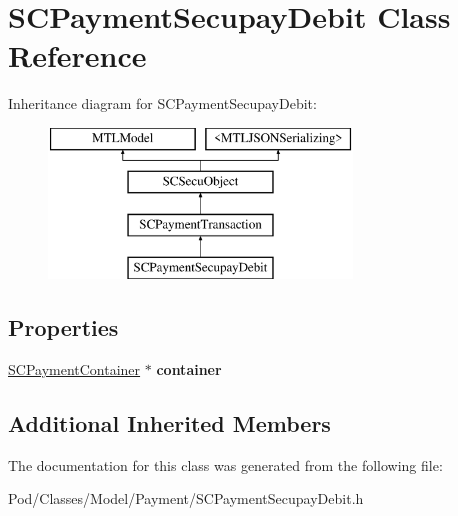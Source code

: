\hypertarget{interface_s_c_payment_secupay_debit}{}\section{S\+C\+Payment\+Secupay\+Debit Class Reference}
\label{interface_s_c_payment_secupay_debit}
Inheritance diagram for S\+C\+Payment\+Secupay\+Debit\+:\begin{figure}[H]
\begin{center}
\leavevmode
\includegraphics[height=4.000000cm]{interface_s_c_payment_secupay_debit}
\end{center}
\end{figure}
\subsection*{Properties}
\begin{DoxyCompactItemize}
\item 
\hyperlink{interface_s_c_payment_container}{S\+C\+Payment\+Container} $\ast$ {\bfseries container}\hypertarget{interface_s_c_payment_secupay_debit_a251737450654d47150e4afee17e11108}{}\label{interface_s_c_payment_secupay_debit_a251737450654d47150e4afee17e11108}

\end{DoxyCompactItemize}
\subsection*{Additional Inherited Members}


The documentation for this class was generated from the following file\+:\begin{DoxyCompactItemize}
\item 
Pod/\+Classes/\+Model/\+Payment/S\+C\+Payment\+Secupay\+Debit.\+h\end{DoxyCompactItemize}
